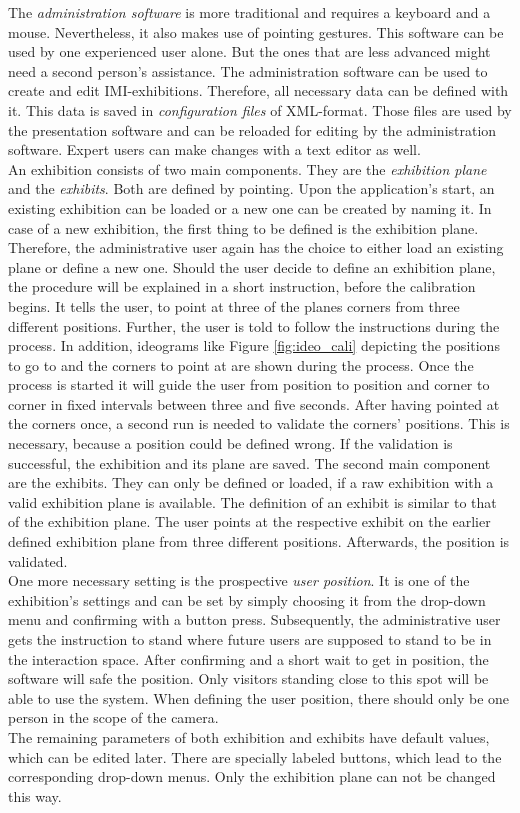 The \textit{administration software} is more traditional and requires a keyboard and a mouse. Nevertheless, it also makes use of pointing gestures. This software can be used by one experienced user alone. But the ones that are less advanced might need a second person's assistance. The administration software can be used to create and edit \ac{IMI}-exhibitions. Therefore, all necessary data can be defined with it. This data is saved in \textit{configuration files} of XML-format. Those files are used by the presentation software and can be reloaded for editing by the administration software. Expert users can make changes with a text editor as well. 
\\
An exhibition consists of two main components. They are the \textit{exhibition plane} and the \textit{exhibits}. Both are defined by pointing. Upon the application's start, an existing exhibition can be loaded or a new one can be created by naming it. In case of a new exhibition, the first thing to be defined is the exhibition plane. Therefore, the administrative user again has the choice to either load an existing plane or define a new one. Should the user decide to define an exhibition plane, the procedure will be explained in a short instruction, before the calibration begins. It tells the user, to point at three of the planes corners from three different positions. Further, the user is told to follow the instructions during the process. In addition, ideograms like Figure \ref{fig:ideo_cali} depicting the positions to go to and the corners to point at are shown during the process. Once the process is started it will guide the user from position to position and corner to corner in fixed intervals between three and five seconds. After having pointed at the corners once, a second run is needed to validate the corners' positions. This is necessary, because a position could be defined wrong. If the validation is successful, the exhibition and its plane are saved. The second main component are the exhibits. They can only be defined or loaded, if a raw exhibition with a valid exhibition plane is available. The definition of an exhibit is similar to that of the exhibition plane. The user points at the respective exhibit on the earlier defined exhibition plane from three different positions. Afterwards, the position is validated.
\\
One more necessary setting is the prospective \textit{user position}. It is one of the exhibition's settings and can be set by simply choosing it from the drop-down menu and confirming with a button press. Subsequently, the administrative user gets the instruction to stand where future users are supposed to stand to be in the interaction space. After confirming and a short wait to get in position, the software will safe the position. Only visitors standing close to this spot will be able to use the system. When defining the user position, there should only be one person in the scope of the camera.
\\
The remaining parameters of both exhibition and exhibits have default values, which can be edited later. There are specially labeled buttons, which lead to the corresponding drop-down menus. Only the exhibition plane can not be changed this way.

